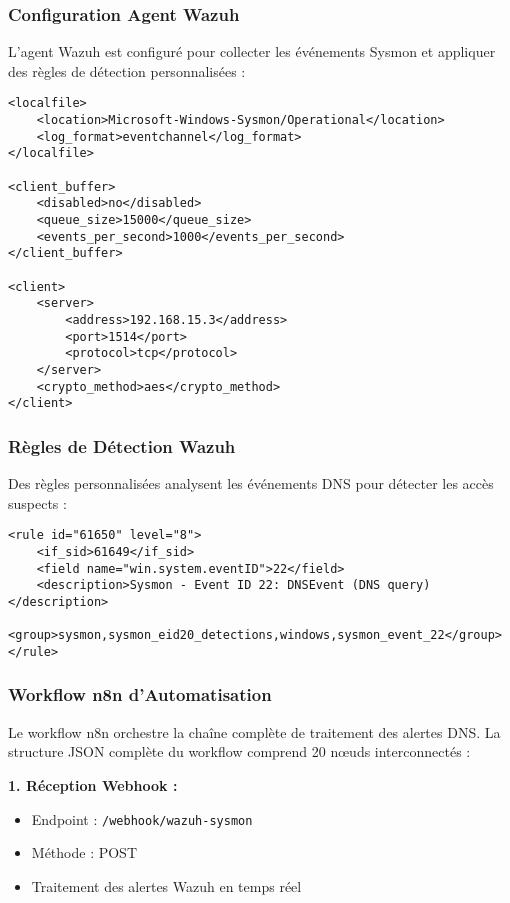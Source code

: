 \subsubsection{Configuration Agent Wazuh}

L'agent Wazuh est configuré pour collecter les événements Sysmon et appliquer des règles de détection personnalisées :

\begin{lstlisting}[style=XMLStyle, caption=Configuration Agent Wazuh, label=lst:wazuh-agent-dns]
<localfile>
    <location>Microsoft-Windows-Sysmon/Operational</location>
    <log_format>eventchannel</log_format>
</localfile>

<client_buffer>
    <disabled>no</disabled>
    <queue_size>15000</queue_size>
    <events_per_second>1000</events_per_second>
</client_buffer>

<client>
    <server>
        <address>192.168.15.3</address>
        <port>1514</port>
        <protocol>tcp</protocol>
    </server>
    <crypto_method>aes</crypto_method>
</client>
\end{lstlisting}

\subsubsection{Règles de Détection Wazuh}

Des règles personnalisées analysent les événements DNS pour détecter les accès suspects :

\begin{lstlisting}[style=XMLStyle, caption=Règle Wazuh DNS, label=lst:wazuh-rule-dns]
<rule id="61650" level="8">
    <if_sid>61649</if_sid>
    <field name="win.system.eventID">22</field>
    <description>Sysmon - Event ID 22: DNSEvent (DNS query)</description>
    <group>sysmon,sysmon_eid20_detections,windows,sysmon_event_22</group>
</rule>
\end{lstlisting}

\subsubsection{Workflow n8n d'Automatisation}

Le workflow n8n orchestre la chaîne complète de traitement des alertes DNS. La structure JSON complète du workflow comprend 20 nœuds interconnectés :

\textbf{1. Réception Webhook :}
\begin{itemize}
    \item Endpoint : \texttt{/webhook/wazuh-sysmon}
    \item Méthode : POST
    \item Traitement des alertes Wazuh en temps réel
\end{itemize}

